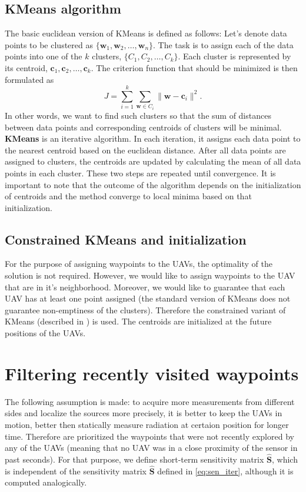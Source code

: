 \subsection{KMeans algorithm}
The basic euclidean version of KMeans is defined as follows:
Let's denote data points to be clustered as $\{\mathbf{w}_{1}, \mathbf{w}_{2}, \dots , \mathbf{w}_{n}\}$.
The task is to assign each of the data points into one of the $k$ clusters, $\{C_{1}, C_{2}, \dots, C_{k}\}$.
Each cluster is represented by its centroid, $\mathbf{c}_{1}, \mathbf{c}_{2}, \dots, \mathbf{c}_{k}$.
The criterion function that should be minimized is then formulated as
\begin{equation}
  J = \sum_{i = 1}^{k} \sum_{\mathbf{w} \in C_{i}} \| \mathbf{w} - \mathbf{c}_{i} \|^{2}.
\end{equation}
In other words, we want to find such clusters so that the sum of distances between data points and corresponding centroids of clusters will be minimal.
\textbf{KMeans} is an iterative algorithm.
In each iteration, it assigns each data point to the nearest centroid based on the euclidean distance. 
After all data points are assigned to clusters, the centroids are updated by calculating the mean of all data points in each cluster. 
These two steps are repeated until convergence.
It is important to note that the outcome of the algorithm depends on the initialization of centroids and the method converge to local minima based on that initialization.

\subsection{Constrained KMeans and initialization}
For the purpose of assigning waypoints to the \ac{UAV}s, the optimality of the solution is not required.
However, we would like to assign waypoints to the \ac{UAV} that are in it's neighborhood.
Moreover, we would like to guarantee that each \ac{UAV} has at least one point assigned (the standard version of KMeans does not guarantee non-emptiness of the clusters).
Therefore the constrained variant of KMeans (described in \cite{constrained_kmeans}) is used.
The centroids are initialized at the future positions of the \ac{UAV}s.





\section{Filtering recently visited waypoints}
The following assumption is made:
to acquire more measurements from different sides and localize the sources more precisely, it is better to keep the \ac{UAV}s in motion, better then statically measure radiation at certaion position for longer time.
Therefore are prioritized the waypoints that were not recently explored by any of the \ac{UAV}s (meaning that no \ac{UAV} was in a close proximity of the sensor in past seconds).
For that purpose, we define short-term sensitivity matrix $\mathbf{\hat{S}}$, which is independent of the sensitivity matrix $\mathbf{\hat{S}}$ defined in \ref{eq:sen_iter}, 
although it is computed analogically.

